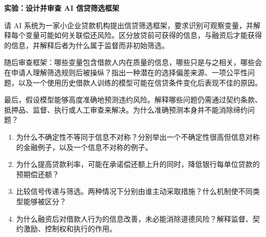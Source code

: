 



\textbf{实验：设计并审查 AI 信贷筛选框架}

请 AI 系统为一家小企业贷款机构提出信贷筛选框架，要求识别可观察变量，并解释每个变量可能如何关联偿还风险。区分放贷前可获得的信息，与融资后才能获得的信息，并解释后者为什么属于监督而非初始筛选。

随后审查框架：哪些变量包含借款人内在质量的信息，哪些只是与之相关，哪些会在申请人理解筛选规则后被操纵？指出一种潜在的选择偏差来源、一项公平性问题，以及一个使用历史借款人训练的模型可能在信贷条件变化后表现不佳的原因。

最后，假设模型能够高度准确地预测违约风险。解释哪些问题仍需通过契约条款、抵押品、监督、执行或人工审查来解决。为什么准确预测本身并不能消除缔约问题？



\begin{enumerate}

\item 为什么不确定性不等同于信息不对称？分别举出一个不确定性很高但信息对称的金融例子，以及一个信息不对称的例子。

\item 为什么提高贷款利率，可能在承诺偿还额上升的同时，降低银行每单位贷款的预期偿还额？


\item 比较信号传递与筛选。两种情况下分别由谁主动采取措施？什么机制使不同类型能够被区分？

\item 为什么融资后对借款人行为的信息改善，未必能消除道德风险？解释监督、契约激励、控制权和执行的作用。



\end{enumerate}



